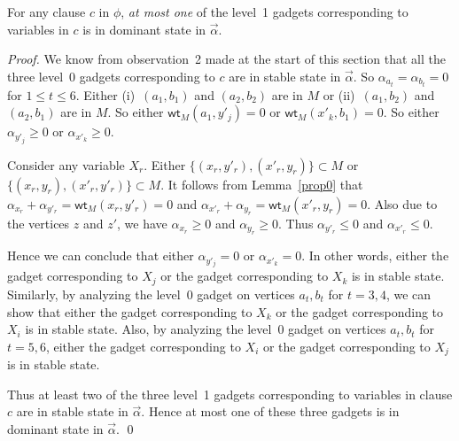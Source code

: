 \documentclass{llncs}
\newcommand{\wt}{\mathsf{wt}}
\begin{document}
\begin{lemma}
  \label{lemma3}
   For any clause $c$ in $\phi$, {\em at most one} of the level~1 gadgets corresponding to variables in $c$ is
  in dominant state in $\vec{\alpha}$.
\end{lemma}
\begin{proof}
  We know from observation~2 made at the start of this section that all the three level~0 gadgets corresponding to $c$ are in stable state in $\vec{\alpha}$.
  So $\alpha_{a_t} = \alpha_{b_t} = 0$ for $1 \le t \le 6$.
  Either (i)~$(a_1,b_1)$ and $(a_2,b_2)$ are in $M$ or (ii)~$(a_1,b_2)$ and $(a_2,b_1)$ are in $M$. So either $\wt_M(a_1,y'_j) = 0$ or $\wt_M(x'_k,b_1) = 0$.
  So either $\alpha_{y'_j} \ge 0$ or $\alpha_{x'_k} \ge 0$.

  Consider any variable $X_r$. Either $\{(x_r,y'_r),(x'_r,y_r)\} \subset M$ or $\{(x_r,y_r),(x'_r,y'_r)\} \subset M$. It follows from Lemma~\ref{prop0} that
  $\alpha_{x_r} + \alpha_{y'_r} = \wt_M(x_r,y'_r) = 0$ and  $\alpha_{x'_r} + \alpha_{y_r} = \wt_M(x'_r,y_r) = 0$.
  Also  due to the vertices $z$ and  $z'$, we have $\alpha_{x_r} \ge 0$ and $\alpha_{y_r} \ge 0$.
  Thus $\alpha_{y'_r} \le 0$ and $\alpha_{x'_r} \le 0$. 

  Hence we can conclude that either $\alpha_{y'_j} = 0$ or $\alpha_{x'_k} = 0$. In other words, either the gadget corresponding to $X_j$ or the gadget
  corresponding to $X_k$ is in stable state. Similarly, by analyzing the level~0 gadget on vertices $a_t,b_t$ for $t = 3,4$, we can show that
  either the gadget corresponding to $X_k$ or the gadget corresponding to $X_i$ is in stable state.
  Also, by analyzing the level~0 gadget on vertices $a_t,b_t$ for $t = 5,6$,  either the gadget corresponding to $X_i$ or the gadget corresponding to $X_j$
  is in stable state.

  Thus at least two of the three level~1 gadgets corresponding to variables in clause $c$ are in stable state in $\vec{\alpha}$. Hence at most one of these three gadgets
   is in dominant state in $\vec{\alpha}$. \qed
\end{proof}
 
\end{document}
